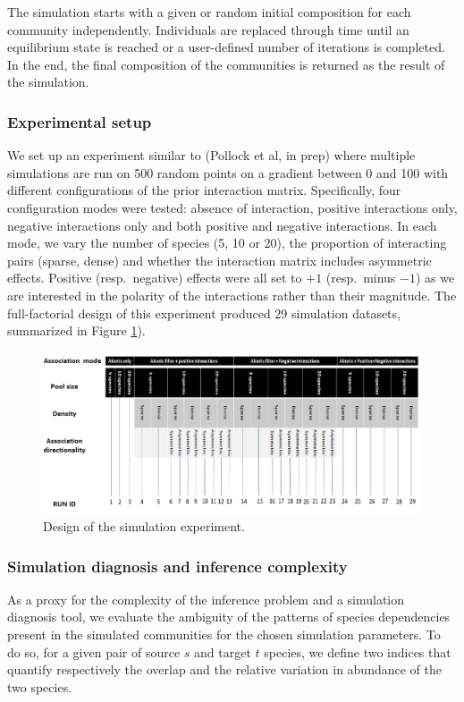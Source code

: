 \documentclass[]{article}
\newcommand{\commG}[1]{#1}
\begin{document}
The simulation starts with a given or random initial composition for each community independently. Individuals are replaced through time until an equilibrium state is reached or a user-defined number of iterations is completed. In the end, the final composition of the communities is returned as the result of the simulation.


\subsubsection{Experimental setup}
We set up an experiment similar to (Pollock et al, in prep) where multiple simulations are run on 500 random points on a gradient between 0 and 100 with different configurations of the prior interaction matrix. Specifically, four configuration modes were tested: absence of interaction, positive interactions only, negative interactions only and both positive and negative interactions. In each mode, we vary the number of species (5, 10 or 20), the proportion of interacting pairs (sparse, dense) and whether the interaction matrix includes asymmetric effects. Positive (resp.\ negative) effects were all set to $+1$ (resp.\ minus $-1$) as we are interested in the polarity of the interactions rather than their magnitude. The full-factorial design of this experiment produced 29 simulation datasets, summarized in Figure \ref{simexp}).

\begin{figure}[h]
	\centering
	\commG{\includegraphics[scale=0.65]{simexp}}
	\caption{Design of the simulation experiment.}
	\label{simexp}
\end{figure} 

\subsubsection{Simulation diagnosis and inference complexity}
As a proxy for the complexity of the inference problem and a simulation diagnosis tool, we evaluate the ambiguity of the patterns of species dependencies present in the simulated communities for the chosen simulation parameters. To do so, for a given pair of source $s$ and target $t$ species, we define two indices that quantify respectively the overlap and the relative variation in abundance of the two species.  
\end{document}
